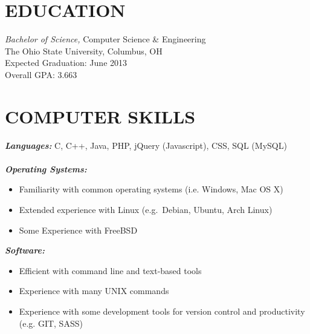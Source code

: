 \documentclass[line,margin,letterpaper]{res}
\begin{document}
\fancyhead{}
\fancyfoot{}
\renewcommand{\headrulewidth}{0pt}

\address{2092 Middlesex road, Columbus, OH 43220}
\address{(614) 678-4408}
\address{ryan@ryanmcg.com}

 
\begin{resume}
 
\section{\uppercase{Education}} {\sl Bachelor of Science,} Computer Science \& Engineering \\
		The Ohio State University, Columbus, OH \\
                Expected Graduation: June 2013 \\
		Overall GPA: 3.663 \\
 
\section{\uppercase{Computer Skills}}
	{\sl\textbf{Languages:}}
	    C, C++, Java, PHP, jQuery (Javascript), CSS, SQL (MySQL) \\ \\
	{\sl\textbf{Operating Systems: }} \hfill 
	    \begin{itemize}
		\item Familiarity with common operating systems (i.e. Windows, Mac OS X)
		\item Extended experience with Linux (e.g.~Debian, Ubuntu, Arch Linux)
		\item Some Experience with FreeBSD
	    \end{itemize}
	{\sl\textbf{Software:}} \hfill 
	    \begin{itemize}
		\item Efficient with command line and text-based tools
		\item Experience with many UNIX commands
		\item Experience with some development tools for version control and productivity (e.g. GIT, SASS)
	    \end{itemize}



\end{resume}
\end{document}
